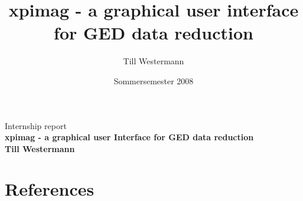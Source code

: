 \documentclass[german,a4paper,12pt,oneside]{paper}
\begin{document}



\title{\Huge xpimag - a graphical user interface for GED data reduction }
\author{Till Westermann}
\date{Sommersemester 2008}
\thispagestyle{empty}
\begin{center}
\Large Internship report \\  \vspace{3.0cm}
\Huge\sffamily\bfseries xpimag - a graphical user Interface for GED data reduction  \normalsize  \\ 
\vspace{10.0cm}
Till Westermann 
\end{center}

\newpage\thispagestyle{empty}



\tableofcontents
 \newpage\thispagestyle{plain}

\pagestyle{plain}
%
\clearpage\newpage
\setcounter{section}{0}

   
   
      

\section{References} 

\end{document}
